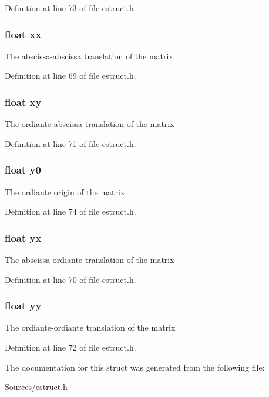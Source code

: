 Definition at line 73 of file estruct.\-h.

\hypertarget{struct__matrix_a9fb9d00fbbf390e0263bcc204b03c7c8}{
\subsubsection[{xx}]{\setlength{\rightskip}{0pt plus 5cm}float xx}}\label{struct__matrix_a9fb9d00fbbf390e0263bcc204b03c7c8}
The abscissa-\/abscissa translation of the matrix 

Definition at line 69 of file estruct.\-h.

\hypertarget{struct__matrix_a83a7590defc35766f789fbbf7fc41590}{
\subsubsection[{xy}]{\setlength{\rightskip}{0pt plus 5cm}float xy}}\label{struct__matrix_a83a7590defc35766f789fbbf7fc41590}
The ordiante-\/abscissa translation of the matrix 

Definition at line 71 of file estruct.\-h.

\hypertarget{struct__matrix_adf19b8ba42d497d3093c3a51b1a32cca}{
\subsubsection[{y0}]{\setlength{\rightskip}{0pt plus 5cm}float y0}}\label{struct__matrix_adf19b8ba42d497d3093c3a51b1a32cca}
The ordiante origin of the matrix 

Definition at line 74 of file estruct.\-h.

\hypertarget{struct__matrix_a8e1608facba0c31efe99d65811fab570}{
\subsubsection[{yx}]{\setlength{\rightskip}{0pt plus 5cm}float yx}}\label{struct__matrix_a8e1608facba0c31efe99d65811fab570}
The abscissa-\/ordiante translation of the matrix 

Definition at line 70 of file estruct.\-h.

\hypertarget{struct__matrix_a342cbf7f29a65a0d1a2949ef4675008e}{
\subsubsection[{yy}]{\setlength{\rightskip}{0pt plus 5cm}float yy}}\label{struct__matrix_a342cbf7f29a65a0d1a2949ef4675008e}
The ordiante-\/ordiante translation of the matrix 

Definition at line 72 of file estruct.\-h.



The documentation for this struct was generated from the following file\-:\begin{DoxyCompactItemize}
\item 
Sources/\hyperlink{estruct_8h}{estruct.\-h}\end{DoxyCompactItemize}
